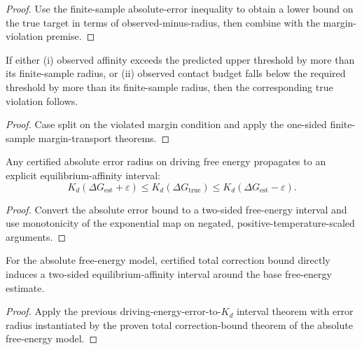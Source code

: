\begin{proof}
Use the finite-sample absolute-error inequality to obtain a lower bound on the true target in terms of observed-minus-radius, then combine with the margin-violation premise.
\end{proof}

\begin{theorem}\label{thm:md-high-confidence-fail-condition-bundle}
If either (i) observed affinity exceeds the predicted upper threshold by more than its finite-sample radius, or (ii) observed contact budget falls below the required threshold by more than its finite-sample radius, then the corresponding true violation follows.
\end{theorem}

\begin{proof}
Case split on the violated margin condition and apply the one-sided finite-sample margin-transport theorems.
\end{proof}

\begin{theorem}\label{thm:kd-interval-from-driving-energy-error}
Any certified absolute error radius on driving free energy propagates to an explicit equilibrium-affinity interval:
\[
K_d(\Delta G_{\mathrm{est}}+\varepsilon) \le K_d(\Delta G_{\mathrm{true}})
\le K_d(\Delta G_{\mathrm{est}}-\varepsilon).
\]
\end{theorem}

\begin{proof}
Convert the absolute error bound to a two-sided free-energy interval and use monotonicity of the exponential map on negated, positive-temperature-scaled arguments.
\end{proof}

\begin{theorem}\label{thm:kd-interval-from-absolute-free-energy-model}
For the absolute free-energy model, certified total correction bound directly induces a two-sided equilibrium-affinity interval around the base free-energy estimate.
\end{theorem}

\begin{proof}
Apply the previous driving-energy-error-to-$K_d$ interval theorem with error radius instantiated by the proven total correction-bound theorem of the absolute free-energy model.
\end{proof}

